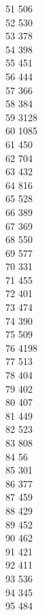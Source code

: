 { 51	506 \\
 52	530 \\
 53	378 \\
 54	398 \\
 55	451 \\
 56	444 \\
 57	366 \\
 58	384 \\
 59	3128 \\
 60	1085 \\
 61	450 \\
 62	704 \\
 63	432 \\
 64	816 \\
 65	528 \\
 66	389 \\
 67	369 \\
 68	550 \\
 69	577 \\
 70	331 \\
 71	455 \\
 72	401 \\
 73	474 \\
 74	390 \\
 75	509 \\
 76	4198 \\
 77	513 \\
 78	404 \\
 79	402 \\
 80	407 \\
 81	449 \\
 82	523 \\
 83	808 \\
 84	56 \\
 85	301 \\
 86	377 \\
 87	459 \\
 88	429 \\
 89	452 \\
 90	462 \\
 91	421 \\
 92	411 \\
 93	536 \\
 94	345 \\
 95	484 \\
}
